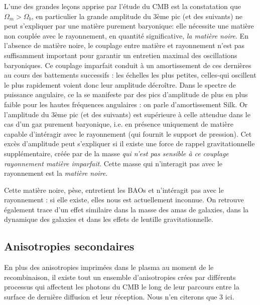L'une des grandes leçons apprise par l'étude du CMB est la constatation que $\Omega_m>\Omega_b$, en particulier la grande amplitude du 3ème pic (et des suivants) ne peut s'expliquer par une matière purement baryonique: elle nécessite une matière non couplée avec le rayonnement, en quantité significative, \textit{la matière noire}. En l'absence de matière noire, le couplage entre matière et rayonnement n'est pas suffisamment important pour garantir un entretien maximal des oscillations baryoniques. Ce couplage imparfait conduit à un amortissement de ces dernières au cours des battements successifs : les échelles les plus petites, celles-qui oscillent le plus rapidement voient donc leur amplitude décroître. Dans le spectre de puissance angulaire, ce la se manifeste par des pics d'amplitude de plus en plus faible pour les hautes fréquences angulaires : on parle d'amortissement Silk. Or l'amplitude du 3ème pic (et des suivants) est supérieure à celle attendue dans le cas d'un gaz purement baryonique, i.e. en présence uniquement de matière capable d'intéragir avec le rayonnement (qui fournit le support de pression). Cet excès d'amplitude peut s'expliquer si il existe une force de rappel gravitationnelle supplémentaire, créée par de la masse \textit{qui n'est pas sensible à ce couplage rayonnement matière imparfait}. Cette masse qui n'interagit pas avec le rayonnement est la \textit{matière noire}.

Cette matière noire, pèse, entretient les BAOs et n'intéragit pas avec le rayonnement : si elle existe, elles nous est actuellement inconnue. On retrouve également trace d'un effet similaire dans la masse des amas de galaxies, dans la dynamique des galaxies et dans les effets de lentille gravitationnelle.

\subsection{Anisotropies secondaires}
En plus des anisotropies imprimées dans le plasma au moment de le recombinaison, il existe tout un ensemble d'anisotropies crées par différents processus qui affectent les photons du CMB le long de leur parcours entre la surface de dernière diffusion et leur réception. Nous n'en citerons que 3 ici.

